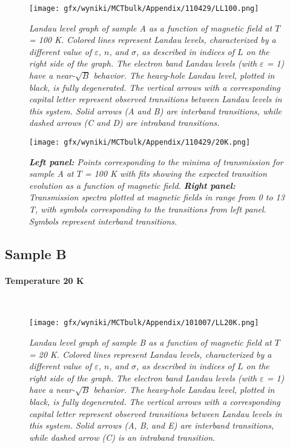\documentclass[titlepage,a4paper]{book}
\newcommand{\myparagraph}[1]{\paragraph{#1}\mbox{}\\}
\begin{document}
\begin{figure}[ht]
	\centering
	\texttt{[image: gfx/wyniki/MCTbulk/Appendix/110429/LL100.png]}
	\vspace{-10pt}
	\caption{\textit{Landau level graph of sample A as a function of magnetic field at $T$ = 100 K. Colored lines represent Landau levels, characterized by a different value of $\varepsilon$, $n$, and $\sigma$, as described in indices of $L$ on the right side of the graph. The electron band Landau levels (with $\varepsilon$ = 1) have a near-$\sqrt{B}$ behavior. The heavy-hole Landau level, plotted in black, is fully degenerated. The vertical arrows with a corresponding capital letter represent observed transitions between Landau levels in this system. Solid arrows (A and B) are interband transitions, while dashed arrows (C and D) are intraband transitions.}}
	\label{fig:LL_110429_100K}
\end{figure}
\begin{figure}[ht]
	\centering
	\texttt{[image: gfx/wyniki/MCTbulk/Appendix/110429/20K.png]}
	\vspace{-10pt}
	\caption{\textit{\textbf{Left panel:} Points corresponding to the minima of transmission for sample A at $T$ = 100 K with fits showing the expected transition evolution as a function of magnetic field. \textbf{Right panel:} Transmission spectra plotted at magnetic fields in range from 0 to 13 T, with symbols corresponding to the transitions from left panel. Symbols represent interband transitions.}}
	\label{fig:Spectra_110429_100K}
\end{figure} 

\clearpage
\subsection{Sample B}
\myparagraph{Temperature 20 K}
\begin{figure}[H]
	\centering
	\texttt{[image: gfx/wyniki/MCTbulk/Appendix/101007/LL20K.png]}
	\vspace{-10pt}
	\caption{\textit{Landau level graph of sample B as a function of magnetic field at $T$ = 20 K. Colored lines represent Landau levels, characterized by a different value of $\varepsilon$, $n$, and $\sigma$, as described in indices of $L$ on the right side of the graph. The electron band Landau levels (with $\varepsilon$ = 1) have a near-$\sqrt{B}$ behavior. The heavy-hole Landau level, plotted in black, is fully degenerated. The vertical arrows with a corresponding capital letter represent observed transitions between Landau levels in this system. Solid arrows (A, B, and E) are interband transitions, while dashed arrow (C) is an intraband transition.}}
	\label{fig:LL_101007_20K}
\end{figure}
\end{document}
